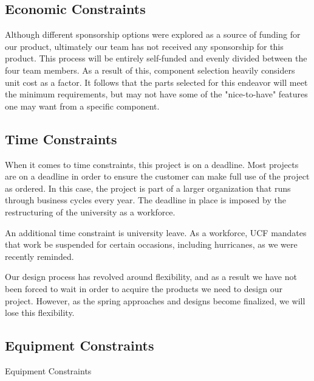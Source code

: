\subsection{Economic Constraints}
Although different sponsorship options were explored as a source of
funding for our product, ultimately our team has not received any
sponsorship for this product. This process will be entirely
self-funded and evenly divided between the four team members. As a
result of this, component selection heavily considers unit cost as a
factor. It follows that the parts selected for this endeavor will meet
the minimum requirements, but may not have some of the "nice-to-have"
features one may want from a specific component. 
\subsection{Time Constraints}

When it comes to time constraints, this project is on a deadline. Most projects are on a deadline in order to ensure the customer can make full use of the project as ordered. In this case, the project is part of a larger organization that runs through business cycles every year. The deadline in place is imposed by the restructuring of the university as a workforce.

An additional time constraint is university leave. As a workforce, UCF mandates that work be suspended for certain occasions, including hurricanes, as we were recently reminded.

Our design process has revolved around flexibility, and as a result we have not been forced to wait in order to acquire the products we need to design our project. However, as the spring approaches and designs become finalized, we will lose this flexibility. 

\subsection{Equipment Constraints}

Equipment Constraints

